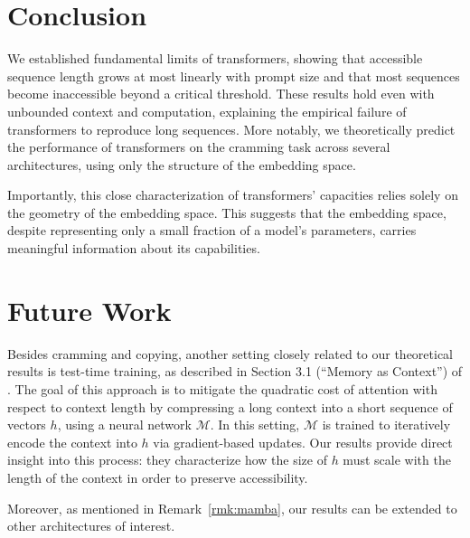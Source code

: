 \section{Conclusion}

We established fundamental limits of transformers, showing that accessible sequence length grows at most linearly with prompt size and that most sequences become inaccessible beyond a critical threshold. These results hold even with unbounded context and computation, explaining the empirical failure of transformers to reproduce long sequences. More notably, we theoretically predict the performance of transformers on the cramming task across several architectures, using only the structure of the embedding space.

Importantly, this close characterization of transformers’ capacities relies solely on the geometry of the embedding space. This suggests that the embedding space, despite representing only a small fraction of a model’s parameters, carries meaningful information about its capabilities.

\section{Future Work}

Besides cramming and copying, another setting closely related to our theoretical results is test-time training, as described in Section 3.1 (``Memory as Context'') of \citet{titans}. The goal of this approach is to mitigate the quadratic cost of attention with respect to context length by compressing a long context into a short sequence of vectors $h$, using a neural network $\mathcal M$. In this setting, $\mathcal M$ is trained to iteratively encode the context into $h$ via gradient-based updates. Our results provide direct insight into this process: they characterize how the size of $h$ must scale with the length of the context in order to preserve accessibility.

Moreover, as mentioned in Remark~\ref{rmk:mamba}, our results can be extended to other architectures of interest.